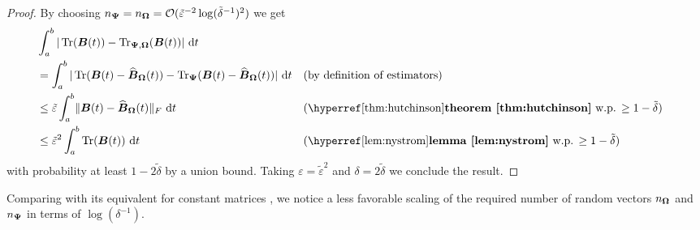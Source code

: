 \documentclass[12pt]{article}
\begin{document}
\begin{proof}
    By choosing $n_{\boldsymbol{\Psi}} = n_{\boldsymbol{\Omega}} = \mathcal{O}(\tilde{\varepsilon}^{-2} \log(\tilde{\delta}^{-1})^2)$ we get
    \begin{align}
        &\int_{a}^{b} | \Trace(\mtx{B}(t)) - \Nystrpp{\mtx{\Omega}}{\mtx{\Psi}}(\mtx{B}(t)) |~\mathrm{d}t \notag \\
        &= \int_{a}^{b} | \Trace(\mtx{B}(t) - \Nystr{\mtx{\Omega}}{\mtx{B}}(t)) - \Hutch{\mtx{\Psi}}(\mtx{B}(t) - \Nystr{\mtx{\Omega}}{\mtx{B}}(t)) |~\mathrm{d}t && \text{(by definition of estimators)} \notag \\
        &\leq \tilde{\varepsilon} \int_{a}^{b} \lVert \mtx{B}(t) - \Nystr{\mtx{\Omega}}{\mtx{B}}(t) \rVert _F ~\mathrm{d}t && \text{(\refthm{thm:hutchinson} w.p. $\geq 1 - \tilde{\delta}$)} \notag \\
        &\leq \tilde{\varepsilon}^2 \int_{a}^{b} \Trace(\mtx{B}(t)) ~\mathrm{d}t && \text{(\reflem{lem:nystrom} w.p. $\geq 1 - \tilde{\delta}$)} 
    \end{align}
    with probability at least $1 - 2\tilde{\delta}$ by a union bound. Taking $\varepsilon = \tilde{\varepsilon}^2$ and $\delta = 2 \tilde{\delta}$ we conclude the result.

\end{proof}

Comparing  with its equivalent for constant matrices \cite[theorem 3.4]{persson-2022-improved-variants}, we notice a less favorable scaling of the required number of random vectors $n_{\boldsymbol{\Omega}}$ and $n_{\boldsymbol{\Psi}}$ in terms of $\log(\delta^{-1})$.

\end{document}

